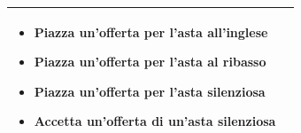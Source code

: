 {\begin{tabular}{|l|p{330pt}|}
		\begin{itemize}[leftmargin=15pt]
			\setlength{\itemsep}{0pt}  %
			\setlength{\parskip}{0pt}  %
			\item Piazza un'offerta per l'asta all'inglese
			\item Piazza un'offerta per l'asta al ribasso
			\item Piazza un'offerta per l'asta silenziosa
		\end{itemize}\medskip

		\begin{itemize}[leftmargin=15pt]
			\item Accetta un'offerta di un'asta silenziosa
		\end{itemize}
		\\ \hline
	\end{tabular}
}

